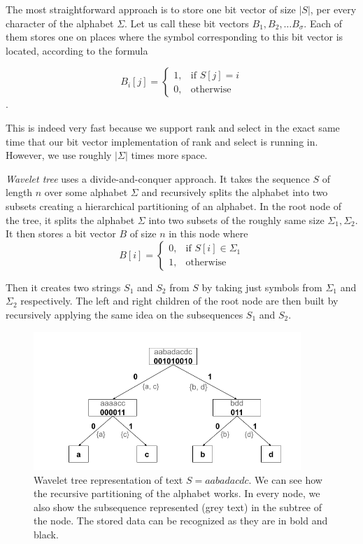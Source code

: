 The most straightforward approach is to store one bit vector of size $|S|$,
per every character of the alphabet $\Sigma$. Let us call these bit vectors $B_1,
B_2, \ldots B_{\sigma}$. Each of them stores one on places where the symbol corresponding
to this bit vector is located, according to the formula

\[
    B_i[j]= 
\begin{cases}
	1,& \text{if } S[j]=i \\
    0,& \text{otherwise}
\end{cases}
\].

This is indeed very fast because we support rank and select in the exact same time
that our bit vector implementation of rank and select is running in. However, we use
roughly $|\Sigma|$ times more space.

\textit{Wavelet tree} uses a divide-and-conquer approach. It takes the sequence $S$ of
length $n$ over some alphabet $\Sigma$ and recursively splits the alphabet into
two subsets creating a hierarchical partitioning of an alphabet. In the root node
of the tree, it splits the alphabet $\Sigma$ into two subsets of the roughly same
size $\Sigma_1, \Sigma_2$. It then stores a bit vector $B$ of size $n$ in this node
where
\[
    B[i]= 
\begin{cases}
    0,& \text{if } S[i]\in \Sigma_1\\
    1,              & \text{otherwise}
\end{cases}
\]

Then it creates two strings $S_1$ and $S_2$ from $S$ by taking just symbols
from $\Sigma_1$ and $\Sigma_2$ respectively. The left and right children of the root node
are then built by recursively applying the same idea on the subsequences $S_1$ and $S_2$.

\begin{figure}
	\centerline{
		\includegraphics[width=0.9\textwidth, height=0.3\textheight]{images/wavelet_tree}
	}
	\caption[TODO]{Wavelet tree representation of text $S=\mathit{aabadacdc}$. We can see how
	the recursive partitioning of the alphabet works. In every node, we also show the
	subsequence represented (grey text) in the subtree of the node. The stored data can be
	recognized as they are in bold and black.
	}
	\label{obr:WaveletTreeExample}
\end{figure}


